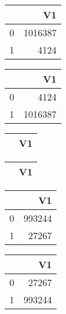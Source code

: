\bigskip\bigskip
\centering
\begin{tabular}{rr}
  \hline
 & V1 \\ 
  \hline
0 & 1016387 \\ 
  1 & 4124 \\ 
   \hline
\end{tabular}

\bigskip\bigskip
\centering
\begin{tabular}{rr}
  \hline
 & V1 \\ 
  \hline
0 & 4124 \\ 
  1 & 1016387 \\ 
   \hline
\end{tabular}

\bigskip\bigskip
\centering
\begin{tabular}{rr}
  \hline
 & V1 \\ 
  \hline
\hline
\end{tabular}

\bigskip\bigskip
\centering
\begin{tabular}{rr}
  \hline
 & V1 \\ 
  \hline
\hline
\end{tabular}

\bigskip\bigskip
\centering
\begin{tabular}{rr}
  \hline
 & V1 \\ 
  \hline
0 & 993244 \\ 
  1 & 27267 \\ 
   \hline
\end{tabular}

\bigskip\bigskip
\centering
\begin{tabular}{rr}
  \hline
 & V1 \\ 
  \hline
0 & 27267 \\ 
  1 & 993244 \\ 
   \hline
\end{tabular}

